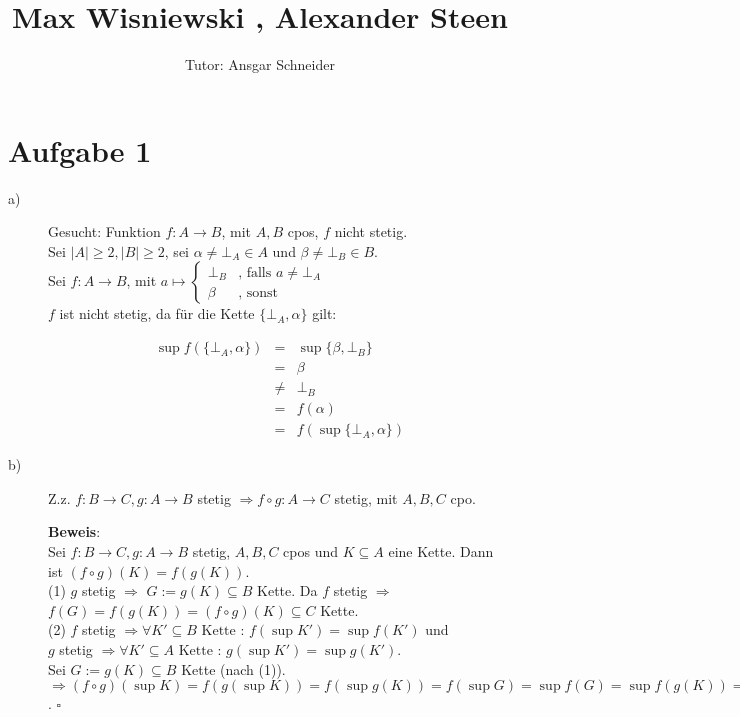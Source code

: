\documentclass[11pt,a4paper,ngerman]{article}
\author{Tutor: Ansgar Schneider}
\date{}
\title{Max Wisniewski , Alexander Steen}
\begin{document}

\maketitle
\thispagestyle{fancy}
\newcommand{\A}{\mathbb{A}}


\section*{Aufgabe 1} 
\begin{description}
\item[a)] Gesucht: Funktion $f : A \to B$, mit $A,B$ cpos, $f$ nicht stetig. \\
Sei $|A| \geq 2, |B| \geq 2$, sei $\alpha \neq \bot_A \in A$ und $\beta \neq \bot_B \in B$.\\
Sei $f : A \to B$, mit $a \mapsto \begin{cases}
\bot_B & \text{, falls } a \neq \bot_A \\
\beta & \text{, sonst}
\end{cases}$\\
$f$ ist nicht stetig, da für die Kette $\{\bot_A, \alpha \}$ gilt: 

\begin{eqnarray*}
\sup f(\{\bot_A, \alpha \}) &=& \sup \{\beta, \bot_B\}\\
&=& \beta \\
&\neq & \bot_B \\
&=& f(\alpha ) \\
&=& f(\sup \{ \bot_A, \alpha\})
\end{eqnarray*}

\item[b)] Z.z. $f: B \to C, g: A \to B$ stetig $\Rightarrow f \circ g: A \to C$ stetig, mit $A,B,C$ cpo. 

\textbf{Beweis}:\\
Sei $f: B \to C, g: A \to B$ stetig, $A,B,C$ cpos und $K \subseteq A$ eine Kette. Dann ist $(f \circ g)(K) = f(g(K))$. \\
(1) $g$ stetig $\Rightarrow$ $G := g(K) \subseteq B$ Kette. Da $f$ stetig $\Rightarrow$ $f(G) = f(g(K)) = (f \circ g)(K) \subseteq C$ Kette.\\

(2) $f$ stetig $\Rightarrow \forall K' \subseteq  B \text{ Kette }: \, f(\sup K') = \sup f(K')$ und\\
$g$ stetig $\Rightarrow \forall K' \subseteq  A \text{ Kette }: \, g(\sup K') = \sup g(K')$.\\
Sei $G := g(K) \subseteq B $ Kette (nach (1)).\\
$\Rightarrow (f \circ g)(\sup K) = f(g(\sup K)) =f(\sup g(K)) = f(\sup G) = \sup f(G) = \sup f(g(K)) = \sup (f \circ g)(K)$.
\mbox{} \hfill $\square$
\end{description}
\end{document}
